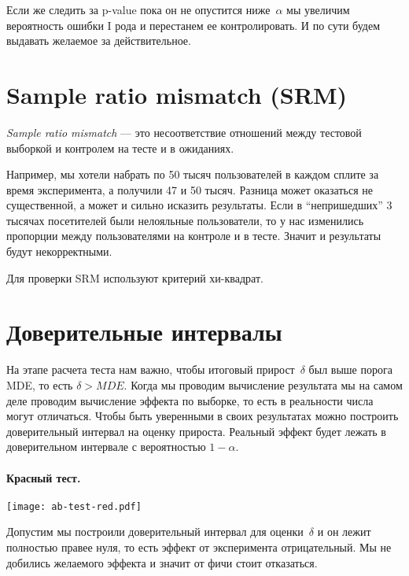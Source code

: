 \documentclass[../handbook.tex]{subfiles}
\begin{document}
Если же следить за p-value пока он не опустится ниже~$\alpha$ мы увеличим вероятность ошибки I рода и перестанем ее контролировать. И по сути будем выдавать желаемое за действительное.

\section{Sample ratio mismatch (SRM)}

\emph{Sample ratio mismatch} --- это несоответствие отношений между тестовой
выборкой и контролем на тесте и в ожиданиях.

Например, мы хотели набрать по 50 тысяч пользователей в каждом сплите за время
эксперимента, а получили 47 и 50 тысяч. Разница может оказаться не
существенной, а может и сильно исказить результаты. Если в ``непришедших'' 3
тысячах посетителей были нелояльные пользователи, то у нас изменились пропорции
между пользователями на контроле и в тесте. Значит и результаты будут
некорректными.

Для проверки SRM используют критерий хи-квадрат.

\section{Доверительные интервалы}
На этапе расчета теста нам важно, чтобы итоговый прирост~$\delta$ был выше
порога MDE, то есть $\delta > MDE$. Когда мы проводим вычисление результата мы на самом деле проводим
вычисление эффекта по выборке, то есть в реальности числа могут отличаться.
Чтобы быть уверенными в своих результатах можно построить доверительный
интервал на оценку прироста. Реальный эффект будет лежать в доверительном интервале с вероятностью $1 - \alpha$.

\paragraph{Красный тест.}
\begin{marginfigure}
    \texttt{[image: ab-test-red.pdf]}
\end{marginfigure}
Допустим мы построили доверительный интервал для оценки~$\delta$ и он лежит
полностью правее нуля, то есть эффект от эксперимента отрицательный. Мы не
добились желаемого эффекта и значит от фичи стоит отказаться.
\end{document}
